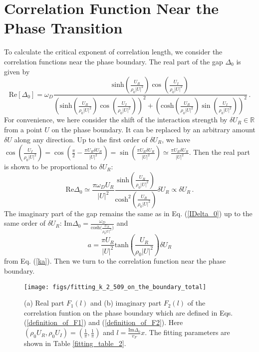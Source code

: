 \documentclass[aps,prl,twocolumn,nofootinbib,superscriptaddress,longbibliography]{revtex4-1}
\begin{document}
\section{Correlation Function Near the Phase Transition}

To calculate the critical exponent of correlation length, we consider the correlation functions near the phase boundary.  The real part of the gap $\Delta_0$ is given by
\begin{equation}
  \text{Re} [\Delta_0] = \omega_D \frac{\text{sinh} \left( \frac{U_R}{\rho_0 |
  U |^2} \right) \cos \left( \frac{U_I}{ \rho_0 | U |^2}
  \right)}{\left( \text{sinh} \left( \frac{U_R}{\rho_0 | U |^2} \right)
  \cos \left( \frac{U_I}{ \rho_0 | U |^2} \right) \right)^2 + \left(
  \text{cosh} \left( \frac{U_R}{\rho_0 | U |^2} \right) \sin \left(
  \frac{U_I}{ \rho_0 | U |^2} \right) \right)^2}\,.\label{Real_gap}
\end{equation}
For convenience, we here consider the shift of the interaction strength by $\delta U_R\in\mathbb{R}$ from a point $U$ on the phase boundary. It can be replaced by an arbitrary amount $\delta U$ along any direction. Up to the first order of $\delta U_R$, we have $\cos \left(
\frac{U_I}{ \rho_0 | U |^2} \right) = \cos \left( \frac{\pi}{2}-\frac{\pi U_R\delta U_R}{|U|^2} \right)=\sin \left(\frac{\pi U_R\delta U_R}{|U|^2} \right) \simeq \frac{\pi U_R\delta U_R}{|U|^2}$. Then the real part is shown to be proportional to $\delta U_R$:
\begin{equation}
  \text{Re} \Delta_0 \simeq \frac{\pi\omega_D U_R}{| U |^2} \frac{\text{sinh}
  \left( \frac{U_R}{\rho_0 | U |^2} \right)}{\text{cosh}^2 \left(
  \frac{U_R}{\rho_0 | U |^2} \right)} \delta U_R \propto \delta U_R\,.
  \label{define_UR_deviation}
\end{equation}
The imaginary part of the gap remains the same as in Eq. (\ref{IDelta_0}) up to the same order of $\delta U_R$: $\text{Im} \Delta_0 =
\frac{\omega_D}{\text{cosh($\frac{U_R}{\rho_0 | U |^2}$)}}$ and   
\begin{equation}
 a=\frac{\pi U_R}{|U|^2}\text{tanh}(\frac{U_R}{\rho_0|U|^2})\delta U_R
 \label{detailed_expression_a}
\end{equation}
from Eq. (\ref{ka}). Then we turn to the correlation function near the phase boundary.

\begin{figure}
	\centering \texttt{[image: figs/fitting\_k\_2\_509\_on\_the\_boundary\_total]}
	\caption{(a) Real part $F_1(l)$ and (b) imaginary part $F_2(l)$ of the correlation funtion on the phase boundary which are defined in Eqs. (\ref{definition_of_F1}) and (\ref{definition_of_F2}). Here $(\rho_{0}U_{R},\rho_{0}U_{I})=(\frac{1}{\pi},\frac{1}{\pi})$ and $l=\frac{\text{Im}\Delta_0}{v_F}x$. The fitting parameters are shown in Table \ref{fitting_table_2}.}
	\label{fig2}
\end{figure}
\end{document}
